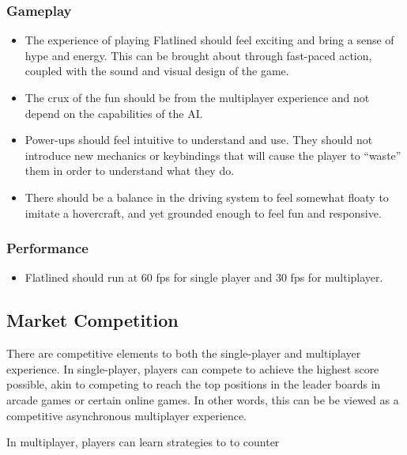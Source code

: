 \documentclass{article}
\newcommand{\name}{Flatlined}
\theoremstyle{definition}
\begin{document}
\subsubsection{Gameplay}

\begin{itemize}
  \item The experience of playing \name{} should feel exciting and bring
    a sense of hype and energy. This can be brought about through fast-paced
    action, coupled with the sound and visual design of the game.
  \item The crux of the fun should be from the multiplayer experience and not
    depend on the capabilities of the AI.\@
  \item Power-ups should feel intuitive to understand and use. They should not
    introduce new mechanics or keybindings that will cause the player to
    ``waste'' them in order to understand what they do.
  \item There should be a balance in the driving system to feel somewhat floaty
    to imitate a hovercraft, and yet grounded enough to feel fun and
    responsive.
\end{itemize}

\subsubsection{Performance}

\begin{itemize}
  \item \name{} should run at 60 fps for single player and 30 fps for
    multiplayer.
\end{itemize}

\subsection{Market Competition}

There are competitive elements to both the single-player and multiplayer
experience. In single-player, players can compete to achieve the highest score
possible, akin to competing to reach the top positions in the leader boards
in arcade games or certain online games. In other words, this can be be viewed
as a competitive asynchronous multiplayer experience.

In multiplayer, players can learn strategies to to counter 
\end{document}
